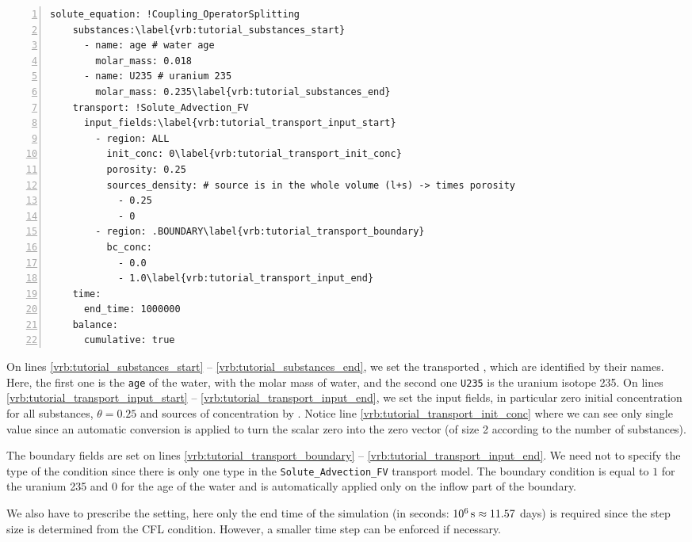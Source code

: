 \begin{Verbatim}[numbers=left, firstnumber=last,commandchars=\\\{\}]
  solute_equation: !Coupling_OperatorSplitting
    substances:\label{vrb:tutorial_substances_start}
      - name: age # water age
        molar_mass: 0.018
      - name: U235 # uranium 235
        molar_mass: 0.235\label{vrb:tutorial_substances_end}
    transport: !Solute_Advection_FV
      input_fields:\label{vrb:tutorial_transport_input_start}
        - region: ALL
          init_conc: 0\label{vrb:tutorial_transport_init_conc}
          porosity: 0.25
          sources_density: # source is in the whole volume (l+s) -> times porosity
            - 0.25
            - 0
        - region: .BOUNDARY\label{vrb:tutorial_transport_boundary}
          bc_conc:
            - 0.0
            - 1.0\label{vrb:tutorial_transport_input_end}
    time:
      end_time: 1000000
    balance:
      cumulative: true
\end{Verbatim}

On lines \ref{vrb:tutorial_substances_start} -- \ref{vrb:tutorial_substances_end}, we set the transported , 
which are identified by their names. Here, the first one is the \verb'age' of the water, with the molar mass of water, 
and the second one \verb'U235' is the uranium isotope 235. 
On lines \ref{vrb:tutorial_transport_input_start} -- \ref{vrb:tutorial_transport_input_end}, we set the input fields, in particular zero initial concentration for all substances,
 $\theta = 0.25$ and 
sources of concentration by . 
Notice line \ref{vrb:tutorial_transport_init_conc} where we can see only single value since an automatic conversion is applied to turn the scalar 
zero into the zero vector (of size 2 according to the number of substances). 

The boundary fields are set on lines \ref{vrb:tutorial_transport_boundary} -- \ref{vrb:tutorial_transport_input_end}. We need not to specify the type of the condition since there is 
only one type in the {\tt Solute\_Advection\_FV} transport model. The boundary condition is equal to $1$ for the uranium 235 and $0$ 
for the age of the water and is automatically applied only on the inflow part of the boundary. 

We also have to prescribe the  setting, here only the end time of the simulation
(in seconds: $10^6\,\rm{s}\approx 11.57$ days) is required since the step size is determined from the CFL condition. 
However, a smaller time step can be enforced if necessary.

